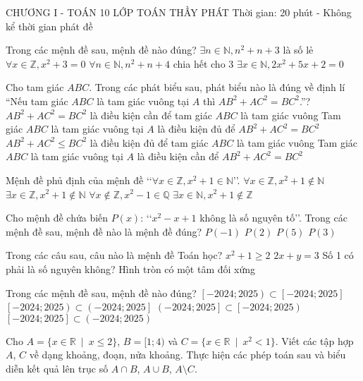 \begin{name}
	{\tenchude}
	{CHƯƠNG I - TOÁN 10}
	{LỚP TOÁN THẦY PHÁT}
	{Thời gian: 20 phút - Không kể thời gian phát đề}
\end{name}

\TN
\begin{ex}
Trong các mệnh đề sau, mệnh đề nào đúng?
\choice
{$\exists n\in \mathbb{N},n^2+n+3$ là số lẻ}
{$\forall x\in \mathbb{Z},x^2+3=0$}
{$\forall n\in \mathbb{N},n^2+n+4$ chia hết cho 3}
{$\exists x\in \mathbb{N},2x^2+5x+2=0$}
\end{ex}
\begin{ex}
Cho tam giác $ABC$. Trong các phát biểu sau, phát biểu nào là đúng về định lí “Nếu tam giác $ABC$ là tam giác vuông tại $A$ thì $AB^2+AC^2=BC^2$.”?
\choice
{$AB^2+AC^2=BC^2$ là điều kiện cần để tam giác $ABC$ là tam giác vuông}
{Tam giác $ABC$ là tam giác vuông tại $A$ là điều kiện đủ để $AB^2+AC^2= BC^2$}
{$AB^2+AC^2 \le BC^2$ là điều kiện đủ để tam giác $ABC$ là tam giác vuông}
{Tam giác $ABC$ là tam giác vuông tại $A$ là điều kiện cần để $AB^2+AC^2=BC^2$}
\end{ex}
\begin{ex}
Mệnh đề phủ định của mệnh đề \lq\lq $\forall x\in \mathbb{Z},x^2+1\in \mathbb{N}$\rq\rq.
\choice
{$\forall x\in \mathbb{Z},x^2+1\notin \mathbb{N}$}
{$\exists x\in \mathbb{Z},x^2+1\notin \mathbb{N}$}
{$\forall x\notin \mathbb{Z},x^2-1\in \mathbb{Q}$}
{$\exists x\in \mathbb{N},x^2+1\notin \mathbb{Z}$}
\end{ex}
\begin{ex}
Cho mệnh đề chứa biến $P(x)$: \lq\lq$x^2-x+1$ không là số nguyên tố\rq\rq. Trong các mệnh đề sau, mệnh đề nào là mệnh đề đúng?
\choice
{$P(-1)$}
{$P(2)$}
{$P(5)$}
{$P(3)$}
\end{ex}
\begin{ex}
Trong các câu sau, câu nào là mệnh đề Toán học?
\choice
{$x^2+1\ge 2$}
{$2x+y=3$}
{Số 1 có phải là số nguyên không?}
{Hình tròn có một tâm đối xứng}
\end{ex}
\begin{ex}
Trong các mệnh đề sau, mệnh đề nào đúng? 
\choice
{$\left[-2024;2025\right)\subset \left[-2024;2025\right]$}
{$\left[-2024;2025\right)\subset \left(-2024;2025\right]$}
{$\left(-2024;2025\right]\subset \left[-2024;2025\right)$}
{$\left[-2024;2025\right]\subset \left(-2024;2025\right)$}
\end{ex}
\TL
\begin{ex}
Cho $A=\{x \in \mathbb{R}\ \mid\ x\le 2 \}$, $B=[1;4)$ và $C=\{x \in \mathbb{R}\ \mid\ x^2<1\}$. Viết các tập hợp $A$, $C$ về dạng khoảng, đoạn, nửa khoảng. Thực hiện các phép toán sau và biểu diễn kết quả lên trục số $A\cap B$, $A\cup B$, $A\setminus C$.
\end{ex}
